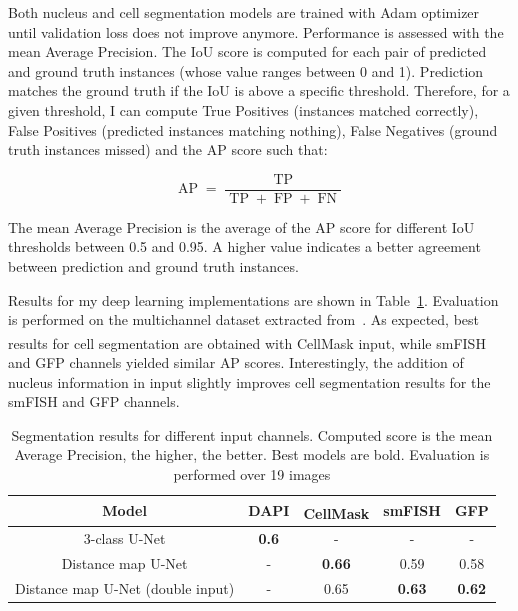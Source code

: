 Both nucleus and cell segmentation models are trained with Adam optimizer~\cite{Diederik_2015} until validation loss does not improve anymore. Performance is assessed with the mean Average Precision.
The \ac{IoU} score is computed for each pair of predicted and ground truth instances (whose value ranges between 0 and 1).
Prediction matches the ground truth if the \ac{IoU} is above a specific threshold.
Therefore, for a given threshold, I can compute True Positives (instances matched correctly), False Positives (predicted instances matching nothing), False Negatives (ground truth instances missed) and the \ac{AP} score such that:

\begin{equation}
	{\displaystyle \operatorname{AP} = \frac{\operatorname{TP}}{\operatorname{TP} + \operatorname{FP} + \operatorname{FN}}}
\end{equation}

\noindent
The mean Average Precision is the average of the \ac{AP} score for different \ac{IoU} thresholds between 0.5 and 0.95.
A higher value indicates a better agreement between prediction and ground truth instances.

Results for my deep learning implementations are shown in Table~\ref{table:segmentation_results}.
Evaluation is performed on the multichannel dataset extracted from~\cite{safieddine_choreography_2021}.
As expected, best results for cell segmentation are obtained with CellMask\textsuperscript{\texttrademark} input, while \ac{smFISH} and \ac{GFP} channels yielded similar \ac{AP} scores.
Interestingly, the addition of nucleus information in input slightly improves cell segmentation results for the \ac{smFISH} and \ac{GFP} channels.

\begin{table}[]
	\centering
	\begin{tabular}{| c | c | c | c | c |}
		\hline
		Model & DAPI & CellMask\textsuperscript{\texttrademark} & smFISH & GFP\\
		\hline
		3-class U-Net & \textbf{0.6} & - & - & -\\
		Distance map U-Net & - & \textbf{0.66} & 0.59 & 0.58\\
		Distance map U-Net (double input) & - & 0.65 & \textbf{0.63} & \textbf{0.62}\\
		\hline
	\end{tabular}
	\caption[Segmentation results]{Segmentation results for different input channels.
	Computed score is the mean Average Precision, the higher, the better.
	Best models are bold.
	Evaluation is performed over 19 images}
	\label{table:segmentation_results}
\end{table}

